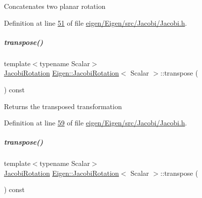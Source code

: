 Concatenates two planar rotation 

Definition at line \hyperlink{eigen_2_eigen_2src_2_jacobi_2_jacobi_8h_source_l00051}{51} of file \hyperlink{eigen_2_eigen_2src_2_jacobi_2_jacobi_8h_source}{eigen/\+Eigen/src/\+Jacobi/\+Jacobi.\+h}.

\mbox{\label{group___jacobi___module_ab40e9cdc4582593511e57ee896e055a2}} 
\subparagraph{\texorpdfstring{transpose()}{transpose()}\hspace{0.1cm}{\footnotesize\ttfamily [1/2]}}
{\footnotesize\ttfamily template$<$typename Scalar$>$ \\
\hyperlink{group___jacobi___module_class_eigen_1_1_jacobi_rotation}{Jacobi\+Rotation} \hyperlink{group___jacobi___module_class_eigen_1_1_jacobi_rotation}{Eigen\+::\+Jacobi\+Rotation}$<$ Scalar $>$\+::transpose (\begin{DoxyParamCaption}{ }\end{DoxyParamCaption}) const\hspace{0.3cm}{\ttfamily [inline]}}

Returns the transposed transformation 

Definition at line \hyperlink{eigen_2_eigen_2src_2_jacobi_2_jacobi_8h_source_l00059}{59} of file \hyperlink{eigen_2_eigen_2src_2_jacobi_2_jacobi_8h_source}{eigen/\+Eigen/src/\+Jacobi/\+Jacobi.\+h}.

\mbox{\label{group___jacobi___module_ab40e9cdc4582593511e57ee896e055a2}} 
\subparagraph{\texorpdfstring{transpose()}{transpose()}\hspace{0.1cm}{\footnotesize\ttfamily [2/2]}}
{\footnotesize\ttfamily template$<$typename Scalar$>$ \\
\hyperlink{group___jacobi___module_class_eigen_1_1_jacobi_rotation}{Jacobi\+Rotation} \hyperlink{group___jacobi___module_class_eigen_1_1_jacobi_rotation}{Eigen\+::\+Jacobi\+Rotation}$<$ Scalar $>$\+::transpose (\begin{DoxyParamCaption}{ }\end{DoxyParamCaption}) const\hspace{0.3cm}{\ttfamily [inline]}}

